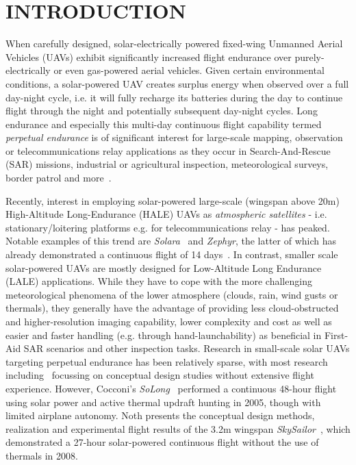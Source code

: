 \section{INTRODUCTION}


When carefully designed, solar-electrically powered fixed-wing Unmanned Aerial Vehicles (UAVs) exhibit significantly increased flight endurance over purely-electrically or even gas-powered aerial vehicles. Given certain environmental conditions, a solar-powered UAV creates surplus energy when observed over a full day-night cycle, i.e. it will fully recharge its batteries during the day to continue flight through the night and potentially subsequent day-night cycles. Long endurance and especially this multi-day continuous flight capability termed \emph{perpetual endurance} is of significant interest for large-scale mapping, observation or telecommunications relay applications as they occur in Search-And-Rescue (SAR) missions, industrial or agricultural inspection, meteorological surveys, border patrol and more~\cite{NASA_Pathfinder}.

Recently, interest in employing solar-powered large-scale (wingspan above 20m) High-Altitude Long-Endurance (HALE) UAVs as \emph{atmospheric satellites} - i.e. stationary/loitering platforms e.g. for telecommunications relay - has peaked. Notable examples of this trend are \textit{Solara}~\cite{IEEE_AtmosphericSatellites} and \textit{Zephyr}, the latter of which has already demonstrated a continuous flight of 14 days~\cite{QinetiQ_Zephyr14dayRecord}. In contrast, smaller scale solar-powered UAVs are mostly designed for Low-Altitude Long Endurance (LALE) applications. While they have to cope with the more challenging meteorological phenomena of the lower atmosphere (clouds, rain, wind gusts or thermals), they generally have the advantage of providing less cloud-obstructed and higher-resolution imaging capability, lower complexity and cost as well as easier and faster handling (e.g. through hand-launchability) as beneficial in First-Aid SAR scenarios and other inspection tasks. Research in small-scale solar UAVs targeting perpetual endurance has been relatively sparse, with most research including~\cite{Morton_ICRA2013} focussing on conceptual design studies without extensive flight experience. However, Cocconi's \textit{SoLong}~\cite{Cocconi_SoLong} performed a continuous 48-hour flight using solar power and active thermal updraft hunting in 2005, though with limited airplane autonomy. Noth presents the conceptual design methods, realization and experimental flight results of the 3.2m wingspan \textit{SkySailor}~\cite{Noth_PhD}, which demonstrated a 27-hour solar-powered continuous flight without the use of thermals in 2008. 

